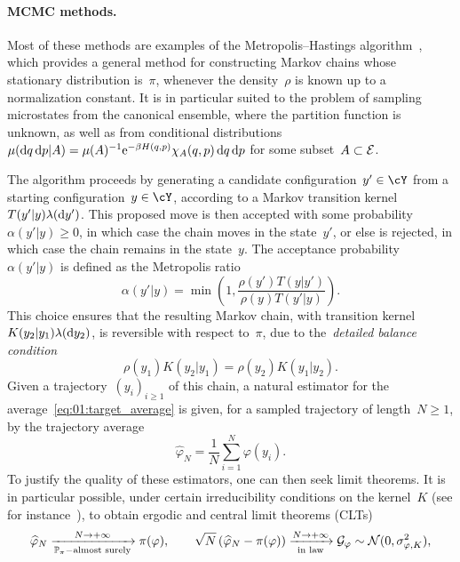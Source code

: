 \paragraph{MCMC methods.}
Most of these methods are examples of the Metropolis--Hastings algorithm~\cite{MRTT53,H70}, which provides a general method for constructing Markov chains whose stationary distribution is~$\pi$, whenever the density~$\rho$ is known up to a normalization constant.
It is in particular suited to the problem of sampling microstates from the canonical ensemble, where the partition function is unknown, as well as from conditional distributions~$\mu(\d q\,\d p|A) = \mathcal \mu(A)^{-1}\e^{-\beta H(q,p)}\chi_{A}(q,p)\,\d q\,\d p$ for some subset~$A\subset\cE$.

The algorithm proceeds by generating a candidate configuration~$y'\in \cY$ from a starting configuration~$y\in\cY$, according to a Markov transition kernel~$T(y'|y)\lambda(\d y')$.
This proposed move is then accepted with some probability~$\alpha(y'|y)\geq 0$, in which case the chain moves in the state~$y'$, or else is rejected, in which case the chain remains in the state~$y$.
The acceptance probability~$\alpha(y'|y)$ is defined as the Metropolis ratio
\begin{equation}
    \alpha(y'|y) = \min\left(1, \frac{\rho(y')T(y|y')}{\rho(y)T(y'|y)}\right).
\end{equation}
This choice ensures that the resulting Markov chain, with transition kernel~$K(y_2 | y_1)\lambda(\d y_2)$, is reversible with respect to~$\pi$, due to the~\textit{detailed balance condition}
$$\rho(y_1) K(y_2|y_1) = \rho(y_2) K(y_1|y_2).$$
Given a trajectory~$(y_i)_{i\geq 1}$ of this chain, a natural estimator for the average~\eqref{eq:01:target_average} is given, for a sampled trajectory of length~$N\geq 1$, by the trajectory average
\begin{equation}
    \label{eq:01:mcmc_ergodic_average}
    \widehat{\varphi}_{N} = \frac1N\sum_{i=1}^N \varphi(y_i).
\end{equation}
To justify the quality of these estimators, one can then seek limit theorems. It is in particular possible, under certain irreducibility conditions on the kernel~$K$ (see for instance~\cite[Theorem 17.0.1]{MT12}), to obtain ergodic and central limit theorems (CLTs)
\begin{equation}
    \widehat{\varphi}_N \xrightarrow[\P_\pi-\text{almost surely}]{N\to+\infty}\pi(\varphi),\qquad \sqrt{N}\left(\widehat{\varphi}_N-\pi(\varphi)\right)\xrightarrow[\text{in law}]{N\to+\infty}\mathcal G_\varphi\sim\mathcal N(0,\sigma^2_{\varphi,K}),
\end{equation}
